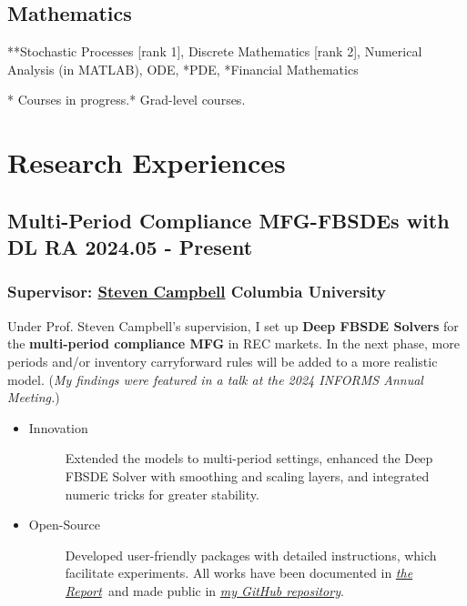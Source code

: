 \documentclass[a4paper]{article}
\newcommand{\mygray}{\color{lg}}
\newcommand{\MFG}{\href{https://github.com/OrangeAoo/Multi-Period-Compliance-MFG-FBSDEs}{\textit{my GitHub repository}}}
\newcommand{\Report}{\href{https://github.com/OrangeAoo/Multi-Compliance-MFG-FBSDEs/blob/ca6adb57636c1fc1ff9daea8d57f004e5762fd4d/FinalReports/Report-v3.pdf}{\textit{the Report}}}
\begin{document}
\subsection{Mathematics} 
**Stochastic Processes {\small[rank 1]}, Discrete Mathematics {\small[rank 2]}, Numerical Analysis {\small(in MATLAB)}, ODE, *PDE, *Financial Mathematics

{\parskip=2pt \mygray
* Courses in progress.\hfill ** Grad-level courses.}
\section{Research Experiences}  %

\hypertarget{FBSDEs}{
    \subsection{Multi-Period Compliance MFG-FBSDEs with DL \normalfont \hfill RA \hspace{40pt} 2024.05 - Present}}
    
\subsubsection{Supervisor:  \href{https://www.stevenacampbell.com/}{Steven Campbell} \hfill Columbia University}

Under Prof. Steven Campbell's supervision, I set up \textbf{Deep FBSDE Solvers} for the \textbf{multi-period compliance MFG} in REC markets. In the next phase, more periods and/or inventory carryforward rules will be added to a more realistic model. (\textit{My findings were featured in a talk at the 2024 INFORMS Annual Meeting.})

\begin{itemize}
    \item\begin{description}
        \item[Innovation] Extended the models to multi-period settings, enhanced the Deep FBSDE Solver with smoothing and scaling layers, and integrated numeric tricks for greater stability.
        \end{description} 
    \item\begin{description}
        \item[Open-Source] Developed user-friendly packages with detailed instructions, which facilitate experiments. All works have been documented in \Report\ and made public in \MFG.
    \end{description}
\end{itemize} 
\end{document}
